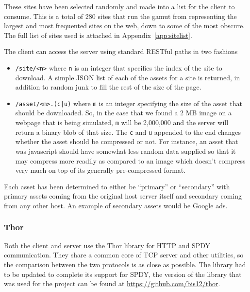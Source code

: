 \documentclass[10pt,letterpaper,notitlepage]{article}
\begin{document}
These sites have been selected randomly and made into a list for the client to
consume. This is a total of 280 sites that run the gamut from representing the
largest and most frequented sites on the web, down to some of the most obscure.
The full list of sites used is attached in Appendix~\ref{app:sitelist}.

The client can access the server using standard RESTful paths in two fashions
\begin{itemize}
\item \texttt{/site/<n>} where \texttt{n} is an integer that specifies the index
of the site to download. A simple JSON list of each of the assets for a site is
returned, in addition to random junk to fill the rest of the size of the page.

\item \texttt{/asset/<m>.(c|u)} where \texttt{m} is an integer specifying the size of the
asset that should be downloaded. So, in the case that we found a 2 MB image on a
webpage that is being simulated, \texttt{m} will be 2,000,000 and the server
will return a binary blob of that size. The \texttt{c} and \texttt{u} appended
to the end changes whether the asset should be compressed or not.  For instance, an asset
that was javascript should have somewhat less random data supplied so that it
may compress more readily as compared to an image which doesn't compress very
much on top of its generally pre-compressed format.
\end{itemize}

Each asset has been determined to either be ``primary'' or ``secondary'' with
primary assets coming from the original host server itself and secondary coming
from any other host.  An example of secondary assets would be Google ads.

\subsubsection{Thor}
\label{sec:research/thor}
Both the client and server use the Thor library for HTTP and SPDY communication.
They share a common core of TCP server and other utilities, so the comparison
between the two protocols is as close as possible.  The library had to be
updated to complete its support for SPDY, the version of the library that was
used for the project can be found at \url{https://github.com/bis12/thor}.

\end{document}
